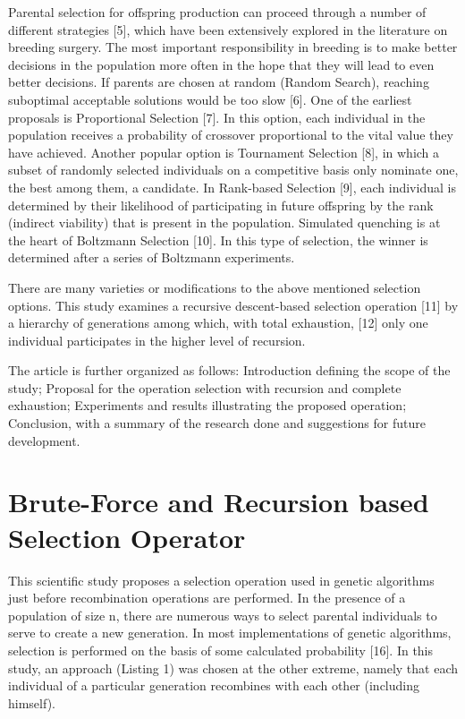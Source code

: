 \documentclass[graybox]{styles/svmult}
\begin{document}
Parental selection for offspring production can proceed through a number of different strategies [5], which have been extensively explored in the literature on breeding surgery. The most important responsibility in breeding is to make better decisions in the population more often in the hope that they will lead to even better decisions. If parents are chosen at random (Random Search), reaching suboptimal acceptable solutions would be too slow [6]. One of the earliest proposals is Proportional Selection [7]. In this option, each individual in the population receives a probability of crossover proportional to the vital value they have achieved. Another popular option is Tournament Selection [8], in which a subset of randomly selected individuals on a competitive basis only nominate one, the best among them, a candidate. In Rank-based Selection [9], each individual is determined by their likelihood of participating in future offspring by the rank (indirect viability) that is present in the population. Simulated quenching is at the heart of Boltzmann Selection [10]. In this type of selection, the winner is determined after a series of Boltzmann experiments.

There are many varieties or modifications to the above mentioned selection options. This study examines a recursive descent-based selection operation [11] by a hierarchy of generations among which, with total exhaustion, [12] only one individual participates in the higher level of recursion.

The article is further organized as follows: Introduction defining the scope of the study; Proposal for the operation selection with recursion and complete exhaustion; Experiments and results illustrating the proposed operation; Conclusion, with a summary of the research done and suggestions for future development.

\section{Brute-Force and Recursion based Selection Operator}
\label{sec:2}

This scientific study proposes a selection operation used in genetic algorithms just before recombination operations are performed. In the presence of a population of size n, there are numerous ways to select parental individuals to serve to create a new generation. In most implementations of genetic algorithms, selection is performed on the basis of some calculated probability [16]. In this study, an approach (Listing 1) was chosen at the other extreme, namely that each individual of a particular generation recombines with each other (including himself).
\end{document}
